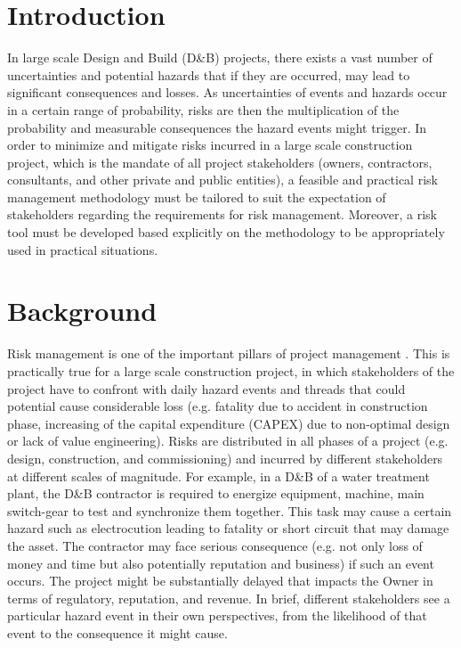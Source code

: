 \documentclass[10pt,halfline,a4paper]{ouparticle}
\begin{document}
\section{Introduction}
\label{sec1}
In large scale Design and Build (D\&B) projects, there exists a vast number of uncertainties and potential hazards that if they are occurred, may lead to significant consequences and losses. As uncertainties of events and hazards occur in a certain range of probability,  risks are then the multiplication of the probability and measurable consequences the hazard events might trigger. In order to minimize and mitigate risks incurred in a large scale construction project, which is the mandate of all project stakeholders (owners, contractors, consultants, and other private and public entities), a feasible and practical risk management methodology must be tailored to suit the expectation of stakeholders regarding the requirements for risk management. Moreover, a risk tool must be developed based explicitly on the methodology to be appropriately used in practical situations. 




\section{Background}
\label{sec2}
Risk management is one of the important pillars of project management \citep{PMI2003}. This is practically true for a large scale construction project, in which stakeholders of the project have to confront with daily hazard events and threads that could potential cause considerable loss (e.g. fatality due to accident in construction phase, increasing of the capital expenditure (CAPEX) due to non-optimal design or lack of value engineering). Risks are distributed in all phases of a project (e.g. design, construction, and commissioning) and incurred by different stakeholders at different scales of magnitude. For example, in a D\&B of a water treatment plant, the D\&B contractor is required to energize equipment, machine, main switch-gear to test and synchronize them together. This task may cause a certain hazard such as electrocution leading to fatality or short circuit that may damage the asset. The contractor may face serious consequence (e.g. not only loss of money and time but also potentially reputation and business) if such an event occurs. The project might be substantially delayed that impacts the Owner in terms of regulatory, reputation, and revenue. In brief, different stakeholders see a particular hazard event in their own perspectives, from the likelihood of that event to the consequence it might cause. 
\end{document}
